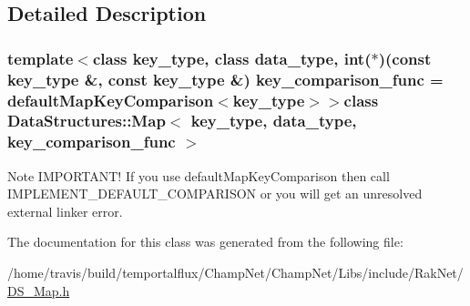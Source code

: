 \subsection{Detailed Description}
\subsubsection*{template$<$class key\-\_\-type, class data\-\_\-type, int($\ast$)(const key\-\_\-type \&, const key\-\_\-type \&) key\-\_\-comparison\-\_\-func = default\-Map\-Key\-Comparison$<$key\-\_\-type$>$$>$class Data\-Structures\-::\-Map$<$ key\-\_\-type, data\-\_\-type, key\-\_\-comparison\-\_\-func $>$}

\begin{DoxyNote}{Note}
I\-M\-P\-O\-R\-T\-A\-N\-T! If you use default\-Map\-Key\-Comparison then call I\-M\-P\-L\-E\-M\-E\-N\-T\-\_\-\-D\-E\-F\-A\-U\-L\-T\-\_\-\-C\-O\-M\-P\-A\-R\-I\-S\-O\-N or you will get an unresolved external linker error. 
\end{DoxyNote}


The documentation for this class was generated from the following file\-:\begin{DoxyCompactItemize}
\item 
/home/travis/build/temportalflux/\-Champ\-Net/\-Champ\-Net/\-Libs/include/\-Rak\-Net/\hyperlink{_d_s___map_8h}{D\-S\-\_\-\-Map.\-h}\end{DoxyCompactItemize}
